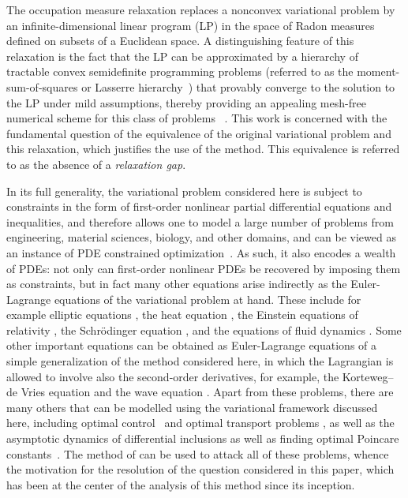 \documentclass{article}
\theoremstyle{definition}
\theoremstyle{remark}
\begin{document}
%
%
The occupation measure relaxation replaces a nonconvex variational problem by an infinite-dimensional linear program (LP)  in the space of Radon measures defined on subsets of a Euclidean space. A distinguishing feature of this relaxation is the fact that the LP can be approximated by a hierarchy of tractable convex semidefinite programming problems (referred to as the moment-sum-of-squares or Lasserre hierarchy~\cite{lasserre2009moments}) that provably converge to the solution to the LP under mild assumptions, thereby providing an appealing mesh-free numerical scheme for this class of problems~\cite{korda2018moments}%
 . 
 This work is concerned with the fundamental question of the equivalence of the original variational problem and this relaxation, which justifies the  use of the method. This equivalence is referred to as the absence of a \emph{relaxation gap}.



In its full generality, the variational problem  considered here is subject to constraints in the form of first-order nonlinear partial differential equations and inequalities, and therefore allows one to model a large number of problems from engineering, material sciences, biology, and other domains, and can be viewed as an instance of PDE constrained optimization~\cite{hinze2008optimization}. As such, it also encodes a wealth of PDEs: not only can first-order nonlinear PDEs be recovered by imposing them as constraints, but in fact many other equations arise indirectly as the Euler-Lagrange equations of the variational problem at hand. These include for example elliptic equations \cite[Chapter 4]{le2016partial}, the heat equation \cite[Section 2.1]{armstrong2018quantitative}, the Einstein equations of relativity \cite[Chapter 3]{ashtekartate}, the Schrödinger equation \cite{kobe2006lagrangian,XU2006627}, and the equations of fluid dynamics \cite{brenier1989least,benamou2000computational%
}. Some other important equations can be obtained as Euler-Lagrange equations of a simple generalization of the method considered here, in which the Lagrangian is allowed to involve also the second-order derivatives, for example,  the Korteweg–de Vries equation \cite{HE2004847} and the wave equation \cite{HE2013158}. Apart from these problems, there are many others that can be modelled using the variational framework discussed here, including optimal control~\cite{lasserre2008nonlinear} and optimal transport problems \cite{bernard2007optimal}, as well as the asymptotic dynamics of differential inclusions \cite{bianchirz} as well as finding optimal Poincare constants~\cite{chernyavsky2021convex}. The method of \cite{korda2018moments} can be used to attack all of these problems, whence the motivation for the resolution of the question considered in this paper, which has been at the center of the analysis of this method since its inception.
\end{document}
